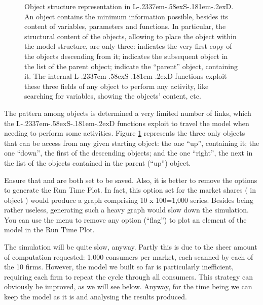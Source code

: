 \documentclass [11pt,a4paper] {book}
\def\LsD{{L\kern-.2337em\lower-.58ex\hbox{S}\kern-.181em\lower-.2ex\hbox{D}}\xspace}
\begin{document}
\begin{figure}[ht]
  \centering
  \caption{\small Object structure representation in \LsD. An object contains the minimum information possible, besides its content of variables, parameters and functions. In particular, the structural content of the objects, allowing to place the object within the model structure, are only three:  indicates the very first copy of the objects descending from it;  indicates the subsequent object in the list of the parent object;  indicate the ``parent'' object, containing it. The internal \LsD functions exploit these three fields of any object to perform any activity, like searching for variables, showing the objects' content, etc.}
   \label{fig:object}
\end{figure}

The pattern among objects is determined a very limited number of links, which the \LsD functions exploit to travel the model when needing to perform some activities. Figure \ref{fig:object} represents the three only objects that can be access from any given starting object: the one ``up'', containing it; the one ``down'', the first of the descending objects; and the one ``right'', the next in the list of the objects contained in the parent (``up'') object. 


Ensure that  and  are both set to be saved. Also, it is better to remove the options to generate the Run Time Plot. In fact, this option set for the market shares ( in object ) would produce a graph comprising 10 x 100=1,000 series. Besides being rather useless, generating such a heavy graph would slow down the simulation. You can use the menu  to remove any option (``flag'') to plot an element of the model in the Run Time Plot.

The simulation will be quite slow, anyway. Partly this is due to the sheer amount of computation requested: 1,000 consumers per market, each scanned by each of the 10 firms. However, the model we built so far is particularly inefficient, requiring each firm to repeat the cycle through all consumers. This strategy can obviously be improved, as we will see below. Anyway, for the time being we can keep the model as it is and analysing the results produced.
\end{document}
